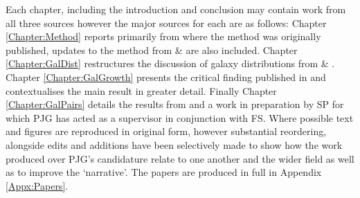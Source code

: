 Each chapter, including the introduction and conclusion may contain work from all three sources however the major sources for each are as follows: Chapter \ref{Chapter:Method} reports primarily from  where the method was originally published, updates to the method from  \&  are also included. Chapter \ref{Chapter:GalDist} restructures the discussion of galaxy distributions from  \& . Chapter \ref{Chapter:GalGrowth} presents the critical finding published in  and contextualises the main result in greater detail. Finally Chapter \ref{Chapter:GalPairs} details the results from  and a work in preparation by SP for which PJG has acted as a supervisor in conjunction with FS. Where possible text and figures are reproduced in original form, however substantial reordering, alongside edits and additions have been selectively made to show how the work produced over PJG's candidature relate to one another and the wider field as well as to improve the `narrative'. The papers are produced in full in Appendix \ref{Appx:Papers}.
